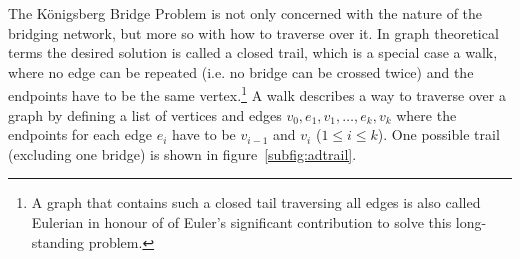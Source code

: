 The K\"onigsberg Bridge Problem is not only concerned with the nature of the
bridging network, but more so with how to traverse over it. In graph theoretical
terms the desired solution is called a closed trail, which is a special case
a walk, where no edge can be repeated (i.e. no bridge can be crossed twice) and
the endpoints have to be the same vertex.\footnote{A graph that contains such a
closed tail traversing all edges is also called Eulerian in honour of of Euler's
significant contribution to solve this long-standing problem.} A walk describes
a way to traverse over a graph by defining a list of vertices and edges
$v_0,e_1,v_1,\dots,e_k,v_k$ where the endpoints for each edge $e_i$ have to be
$v_{i-1}$ and $v_i$ ($1\leq i\leq k$). One possible trail (excluding one
bridge) is shown in figure~\ref{subfig:adtrail}. 
%
\begin{figure}[htb]
    \centering
    \hspace{0.5cm}
\end{figure}
